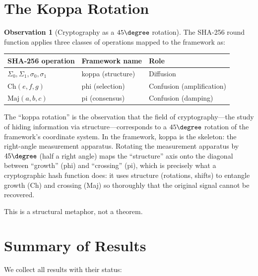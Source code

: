 \documentclass[12pt, a4paper]{article}
\theoremstyle{plain}
\theoremstyle{definition}
\newtheorem{observation}[theorem]{Observation}
\newcommand{\Ch}{\mathrm{Ch}}
\newcommand{\Maj}{\mathrm{Maj}}
\begin{document}
\section{The Koppa Rotation}\label{sec:koppa}

\begin{observation}[Cryptography as a $45\degree$ rotation]\label{obs:koppa}
The SHA-256 round function applies three classes of operations
mapped to the framework as:
\begin{center}
\begin{tabular}{lll}
\toprule
SHA-256 operation & Framework name & Role\\
\midrule
$\Sigma_{0},\Sigma_{1},\sigma_{0},\sigma_{1}$ & koppa (structure) & Diffusion\\
$\Ch(e,f,g)$ & phi (selection) & Confusion (amplification)\\
$\Maj(a,b,c)$ & pi (consensus) & Confusion (damping)\\
\bottomrule
\end{tabular}
\end{center}

The ``koppa rotation'' is the observation that the field of
cryptography---the study of hiding information via
structure---corresponds to a $45\degree$ rotation of the
framework's coordinate system.
In the framework, koppa is the skeleton: the right-angle
measurement apparatus.
Rotating the measurement apparatus by $45\degree$ (half a right
angle) maps the ``structure'' axis onto the diagonal between
``growth'' (phi) and ``crossing'' (pi), which is precisely
what a cryptographic hash function does: it uses structure
(rotations, shifts) to entangle growth (Ch) and crossing (Maj)
so thoroughly that the original signal cannot be recovered.

This is a structural metaphor, not a theorem.
\end{observation}

\section{Summary of Results}\label{sec:summary}

We collect all results with their status:
\end{document}
